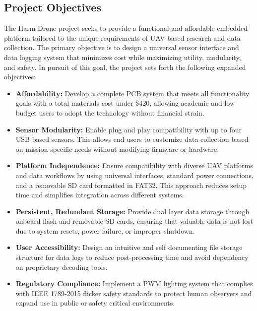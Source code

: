 \documentclass[12pt]{article}
\begin{document}
\subsection{Project Objectives}

\par The Harm Drone project seeks to provide a functional and affordable embedded platform tailored to the unique requirements of UAV based research and data collection. The primary objective is to design a universal sensor interface and data logging system that minimizes cost while maximizing utility, modularity, and safety. In pursuit of this goal, the project sets forth the following expanded objectives:

\begin{itemize}
\item \textbf{Affordability:} Develop a complete PCB system that meets all functionality goals with a total materials cost under \$420, allowing academic and low budget users to adopt the technology without financial strain.

\item \textbf{Sensor Modularity:} Enable plug and play compatibility with up to four USB based sensors. This allows end users to customize data collection based on mission specific needs without modifying firmware or hardware.

\item \textbf{Platform Independence:} Ensure compatibility with diverse UAV platforms and data workflows by using universal interfaces, standard power connections, and a removable SD card formatted in FAT32. This approach reduces setup time and simplifies integration across different systems.

\item \textbf{Persistent, Redundant Storage:} Provide dual layer data storage through onboard flash and removable SD cards, ensuring that valuable data is not lost due to system resets, power failure, or improper shutdown.

\item \textbf{User Accessibility:} Design an intuitive and self documenting file storage structure for data logs to reduce post-processing time and avoid dependency on proprietary decoding tools.

\item \textbf{Regulatory Compliance:} Implement a PWM lighting system that complies with IEEE 1789-2015 flicker safety standards to protect human observers and expand use in public or safety critical environments.


\end{itemize}
\end{document}
